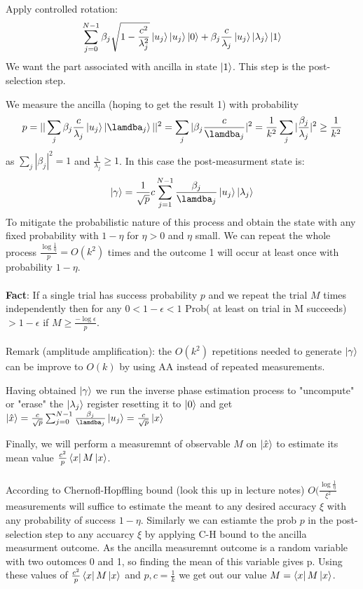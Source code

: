 \documentclass{article}
\begin{document}
\begin{itemlist}
                \item Apply controlled rotation:
                        $$
                        \sum_{j=0}^{N-1} \beta_j \sqrt{1- \frac{c^2}{\lambda_j^2}} \ket{u_j} \ket{u_j} \ket{0} + \beta_j \frac{c}{\lambda_j} \ket{u_j} \ket{\lambda_j}\ket{1}
                        $$
                        We want the part associated with ancilla in state $\ket{1}$. This step is the post-selection step.\\
                \item We measure the ancilla (hoping to get the result 1) with probability $$p = || \sum_j \beta_j \frac{c}{\lambda_j} \ket{u_j} \ket{ \lamdba_j} ||^2 = \sum_j |\beta_j \frac{c}{\lamdba_j}|^2 = \frac{1}{k^2} \sum_j |\frac{\beta_j}{\lambda_j}|^2 \geq \frac{1}{k^2}$$ as $\sum_j |\beta_j|^2 =1$ and $\frac{1}{\lambda_j} \geq 1$. In this case the post-measurment state is:
                        $$
                         \ket{\gamma} = \frac{1}{\sqrt{p}} c \sum_{j=1}^{N-1} \frac{\beta_j}{\lamdba_j} \ket{u_j} \ket{\lambda_j}
                        $$
                        To mitigate the probabilistic nature of this process and obtain the state with any fixed probability with $1-\eta$ for $\eta >0$ and $\eta$ small. We can repeat the whole process $\frac{\log \frac{1}{\eta}}{p} = O(k^2)$ times and the outcome 1 will occur at least once with probability $1- \eta$.\\\\
               \textbf{Fact}: If a single trial has success probability $p$ and we repeat the trial $M$ times independently then for any $0 < 1- \epsilon< 1$  Prob( at least on trial in M succeeds) $> 1- \epsilon$ if $M \geq \frac{- \log \epsilon}{p}$.\\\\
        Remark (amplitude amplification): the $O(k^2)$ repetitions needed to generate $\ket{\gamma}$ can be improve to $O(k)$ by using AA instead of repeated measurements.\\
\item Having obtained $\ket{\gamma}$ we run the inverse phase estimation process to "uncompute" or "erase" the $\ket{\lambda_j}$ register resetting it to $\ket{0}$ and get $\ket{\hat x} = \frac{c}{\sqrt{p}} \sum_{j=0}^{N-1} \frac{\beta_j}{\lamdba_j} \ket{u_j} = \frac{c}{\sqrt{p}}\ket{x}$\\
\item Finally, we will perform a measuremnt of observable $M$ on $\ket{\hat x}$ to estimate its mean value $\frac{c^2}{p} \bra{x} M \ket{x}$.\\\\
        According to Chernofl-Hopffling bound (look this up in lecture notes) $O(\frac{\log \frac{1}{\eta}}{\xi^2}$ measurements will suffice to estimate the meant to any desired accuracy $\xi$ with any probability of success $1- \eta$. Similarly we can estiamte the prob $p$ in the post-selection step to any accuarcy $\xi$ by applying C-H bound to the ancilla measurment outcome. As the ancilla measuremnt outcome is a random variable with two outomces 0 and 1, so finding the mean of this variable gives p. Using these values of $\frac{c^2}{p} \bra{x} M \ket{x}$ and $p, c= \frac{1}{k}$ we get out our value $M= \bra{x} M \ket{x}$.
 \end{itemlist}
\end{document}
